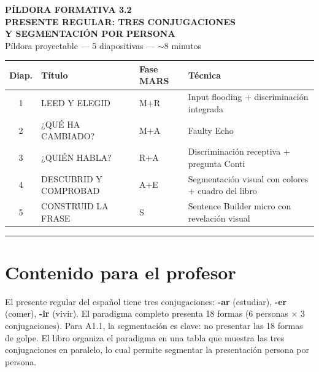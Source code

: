 \documentclass[a4paper,10pt]{article}
\renewcommand{\arraystretch}{1.3}
\begin{document}

\begin{center}
{\LARGE\textbf{\textcolor{azulprincipal}{PÍLDORA FORMATIVA 3.2}}}\\[0.4cm]
{\Large\textbf{PRESENTE REGULAR: TRES CONJUGACIONES\\Y SEGMENTACIÓN POR PERSONA}}\\[0.5cm]
{\large Píldora proyectable — 5 diapositivas — $\sim$8 minutos}
\end{center}

\vspace{0.5cm}

\begin{tcolorbox}[colback=azulclaro, colframe=azulprincipal, title={\textbf{Resumen de diapositivas}}, fonttitle=\bfseries, boxrule=1pt, arc=3pt]
\renewcommand{\arraystretch}{1.4}
\begin{tabularx}{\textwidth}{c l l X}
\textbf{Diap.} & \textbf{Título} & \textbf{Fase MARS} & \textbf{Técnica} \\
\midrule
1 & LEED Y ELEGID & M+R & Input flooding + discriminación integrada \\
2 & ¿QUÉ HA CAMBIADO? & M+A & Faulty Echo \\
3 & ¿QUIÉN HABLA? & R+A & Discriminación receptiva + pregunta Conti \\
4 & DESCUBRID Y COMPROBAD & A+E & Segmentación visual con colores + cuadro del libro \\
5 & CONSTRUID LA FRASE & S & Sentence Builder micro con revelación visual \\
\end{tabularx}
\end{tcolorbox}

\vspace{0.5cm}

\noindent\textcolor{azulprincipal}{\rule{\linewidth}{2pt}}
\section*{\textcolor{azulprincipal}{Contenido para el profesor}}

El presente regular del español tiene tres conjugaciones: \textbf{-ar} (estudiar), \textbf{-er} (comer), \textbf{-ir} (vivir). El paradigma completo presenta 18 formas (6 personas $\times$ 3 conjugaciones). Para A1.1, la segmentación es clave: no presentar las 18 formas de golpe. El libro organiza el paradigma en una tabla que muestra las tres conjugaciones en paralelo, lo cual permite segmentar la presentación persona por persona.
\end{document}
